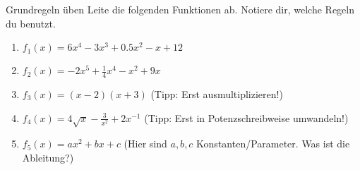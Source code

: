 \begin{aufgabenumgebung}[A:EinfacheAbleitungen]{Grundregeln üben}
Leite die folgenden Funktionen ab. Notiere dir, welche Regeln du benutzt.
\begin{enumerate}
    \item $f_1(x) = 6x^4 - 3x^3 + 0.5x^2 - x + 12$
    \item $f_2(x) = -2x^5 + \frac{1}{4}x^4 - x^2 + 9x$
    \item $f_3(x) = (x-2)(x+3)$ (Tipp: Erst ausmultiplizieren!)
    \item $f_4(x) = 4\sqrt{x} - \frac{3}{x^2} + 2x^{-1}$ (Tipp: Erst in Potenzschreibweise umwandeln!)
    \item $f_5(x) = ax^2 + bx + c$ (Hier sind $a,b,c$ Konstanten/Parameter. Was ist die Ableitung?)
\end{enumerate}
\end{aufgabenumgebung}


